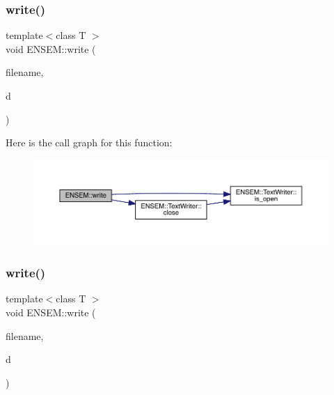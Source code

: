 \subsubsection{\texorpdfstring{write()}{write()}\hspace{0.1cm}{\footnotesize\ttfamily [12/13]}}
{\footnotesize\ttfamily template$<$class T $>$ \\
void E\+N\+S\+E\+M\+::write (\begin{DoxyParamCaption}\item[{const std\+::string \&}]{filename,  }\item[{const \mbox{\hyperlink{classENSEM_1_1EScalar}{E\+Scalar}}$<$ T $>$ \&}]{d }\end{DoxyParamCaption})\hspace{0.3cm}{\ttfamily [inline]}}

Here is the call graph for this function\+:\nopagebreak
\begin{figure}[H]
\begin{center}
\leavevmode
\includegraphics[width=350pt]{d2/d94/namespaceENSEM_a5360eb9dd0dfcdb3fcf8f085117ddf8a_cgraph}
\end{center}
\end{figure}
\mbox{\label{namespaceENSEM_a2159da8c0a7ad6eec6b0d7179f0251e8}} 
\subsubsection{\texorpdfstring{write()}{write()}\hspace{0.1cm}{\footnotesize\ttfamily [13/13]}}
{\footnotesize\ttfamily template$<$class T $>$ \\
void E\+N\+S\+E\+M\+::write (\begin{DoxyParamCaption}\item[{const std\+::string \&}]{filename,  }\item[{const \mbox{\hyperlink{classENSEM_1_1Ensem}{Ensem}}$<$ T $>$ \&}]{d }\end{DoxyParamCaption})\hspace{0.3cm}{\ttfamily [inline]}}

